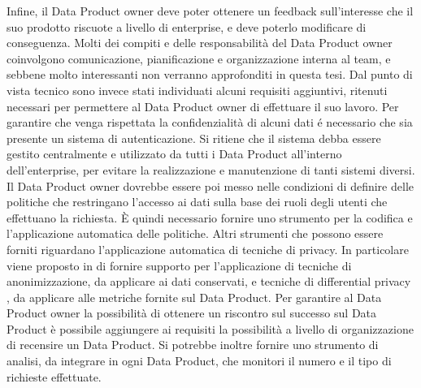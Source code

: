 \documentclass[12pt]{report}
\begin{document}
Infine, il Data Product owner deve poter ottenere un feedback sull'interesse che il suo prodotto riscuote a livello di enterprise, e deve poterlo modificare di conseguenza.
Molti dei compiti e delle responsabilità del Data Product owner coinvolgono comunicazione, pianificazione e organizzazione interna al team, e sebbene molto interessanti non verranno approfonditi in questa tesi.
Dal punto di vista tecnico sono invece stati individuati alcuni requisiti aggiuntivi, ritenuti necessari per permettere al Data Product owner di effettuare il suo lavoro.
Per garantire che venga rispettata la confidenzialità di alcuni dati é necessario che sia presente un sistema di autenticazione.
Si ritiene che il sistema debba essere gestito centralmente e utilizzato da tutti i Data Product all'interno dell'enterprise, per evitare la realizzazione e manutenzione di tanti sistemi diversi. 
Il Data Product owner dovrebbe essere poi messo nelle condizioni di definire delle politiche che restringano l'accesso ai dati sulla base dei ruoli degli utenti che effettuano la richiesta.
È quindi necessario fornire uno strumento per la codifica e l'applicazione automatica delle politiche.
Altri strumenti che possono essere forniti riguardano l'applicazione automatica di tecniche di privacy. 
In particolare  viene proposto in \cite{dehghani_data_2022} di fornire supporto per l'applicazione di tecniche di anonimizzazione, da applicare ai dati conservati, e tecniche di differential privacy \cite{dwork2006differential}, da applicare alle metriche fornite sul Data Product.
Per garantire al Data Product owner la possibilità di ottenere un riscontro sul successo sul Data Product è possibile aggiungere ai requisiti la possibilità a livello di organizzazione di recensire un Data Product. 
Si potrebbe inoltre fornire uno strumento di analisi, da integrare in ogni Data Product, che monitori il numero e il tipo di richieste effettuate.
\end{document}
